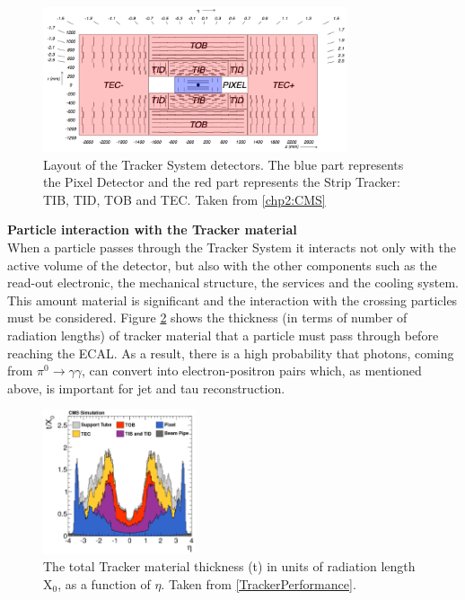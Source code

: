 \begin{figure}[ht]
    \begin{center}
      \includegraphics[width=0.8\textwidth]{figuras/Chapter2/Tracker.png}
      \caption{Layout of the Tracker System detectors. The blue part represents 
      the Pixel Detector and the red part represents the Strip Tracker: TIB,
      TID, TOB and TEC. Taken from \ref{chp2:CMS}} \label{figchp2:Tracker}
    \end{center}
 \end{figure}

\textbf{Particle interaction with the Tracker material} \\

When a particle passes through the Tracker System it interacts not only with the active volume
of the detector, but also with the other components such as the read-out electronic, 
the mechanical structure, the services and the cooling system. This amount material is significant
and the interaction with the crossing particles must be considered. Figure \ref{figchp2:Tracker_TrackerMaterial}
shows the thickness (in terms of number of radiation lengths) of tracker material that a particle must 
pass through before reaching the ECAL. As a result, there is a high probability that 
photons, coming from $\pi^{0} \rightarrow \gamma\gamma$, can convert into electron-positron 
pairs which, as mentioned above, is important for jet and tau reconstruction.

\begin{figure}[ht]
    \begin{center}
      \includegraphics[width=0.4\textwidth]{figuras/Chapter2/Tracker_Thickness.png}
      \caption{The total Tracker material thickness (t) in units of radiation length X$_{0}$, as a 
      function of $\eta$. Taken from \ref{TrackerPerformance}.
      } \label{figchp2:Tracker_TrackerMaterial}
    \end{center}
 \end{figure}

